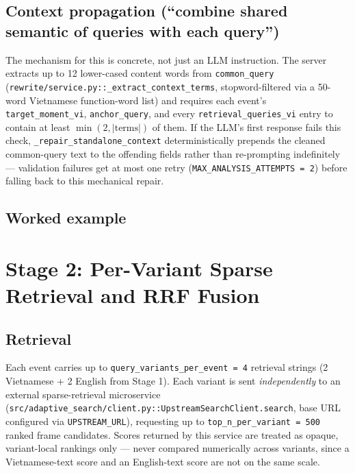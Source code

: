 \documentclass[11pt]{article}
\newcommand{\code}[1]{\texttt{\small #1}}
\newcommand{\file}[1]{\texttt{\footnotesize #1}}
\begin{document}
\subsection{Context propagation (``combine shared semantic of queries with
each query'')}
The mechanism for this is concrete, not just an LLM instruction. The server
extracts up to 12 lower-cased content words from \code{common\_query}
(\file{rewrite/service.py::\_extract\_context\_terms}, stopword-filtered via a
50-word Vietnamese function-word list) and requires each event's
\code{target\_moment\_vi}, \code{anchor\_query}, and every
\code{retrieval\_queries\_vi} entry to contain at least
$\min(2, |\text{terms}|)$ of them. If the LLM's first response fails this
check, \code{\_repair\_standalone\_context} deterministically prepends the
cleaned common-query text to the offending fields rather than re-prompting
indefinitely --- validation failures get at most one retry
(\code{MAX\_ANALYSIS\_ATTEMPTS = 2}) before falling back to this mechanical
repair.

\subsection{Worked example}
\label{sec:stage1-example}


\section{Stage 2: Per-Variant Sparse Retrieval and RRF Fusion}
\label{sec:stage2}

\subsection{Retrieval}
Each event carries up to \code{query\_variants\_per\_event = 4} retrieval
strings (2 Vietnamese + 2 English from Stage 1). Each variant is sent
\emph{independently} to an external sparse-retrieval microservice
(\file{src/adaptive\_search/client.py::UpstreamSearchClient.search}, base URL
configured via \code{UPSTREAM\_URL}), requesting up to
\code{top\_n\_per\_variant = 500} ranked frame candidates. Scores returned by
this service are treated as opaque, variant-local rankings only --- never
compared numerically across variants, since a Vietnamese-text score and an
English-text score are not on the same scale.
\end{document}
